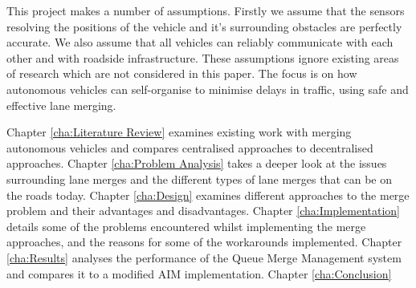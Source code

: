 This project makes a number of assumptions. Firstly we assume that the sensors resolving the positions of the vehicle and it's surrounding obstacles are perfectly accurate. We also assume that all vehicles can reliably communicate with each other and with roadside infrastructure. These assumptions ignore existing areas of research which are not considered in this paper. The focus is on how autonomous vehicles can self-organise to minimise delays in traffic, using safe and effective lane merging.

Chapter \ref{cha:Literature Review} examines existing work with merging autonomous vehicles and compares centralised approaches to decentralised approaches. Chapter \ref{cha:Problem Analysis} takes a deeper look at the issues surrounding lane merges and the different types of lane merges that can be on the roads today. Chapter \ref{cha:Design} examines different approaches to the merge problem and their advantages and disadvantages. Chapter \ref{cha:Implementation} details some of the problems encountered whilst implementing the merge approaches, and the reasons for some of the workarounds implemented. Chapter \ref{cha:Results} analyses the performance of the Queue Merge Management system and compares it to a modified AIM implementation. Chapter \ref{cha:Conclusion}  